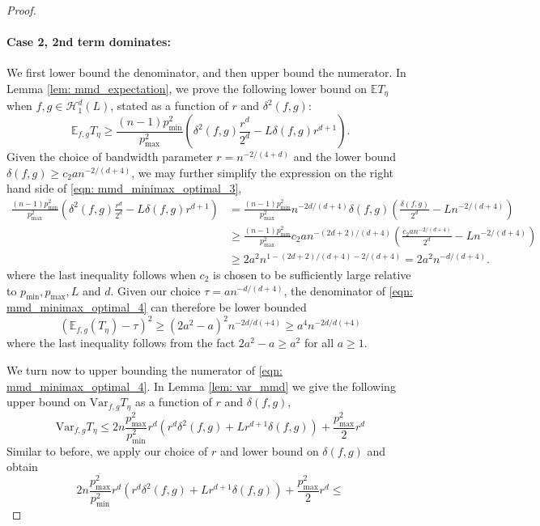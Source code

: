 \documentclass{article}
\newcommand{\Var}{\mathrm{Var}}
\newcommand{\1}{\mathbb{I}}
\newcommand{\Ebb}{\mathbb{E}}
\theoremstyle{alden}
\theoremstyle{aldenthm}
\theoremstyle{definition}
\theoremstyle{remark}
\begin{document}
\begin{proof}
	\paragraph{Case 2, 2nd term dominates:}
	We first lower bound the denominator, and then upper bound the numerator. In Lemma \ref{lem: mmd_expectation}, we prove the following lower bound on $\Ebb T_{\eta}$ when $f,g \in \mathcal{H}_1^{d}(L)$, stated as a function of $r$ and $\delta^2(f,g)$:
	\begin{equation}
	\label{eqn: mmd_minimax_optimal_3}
	\Ebb_{f,g} T_{\eta} \geq \frac{(n - 1)p_{\min}^2}{ p_{\max}^2} \left(\delta^2(f,g)\frac{r^d}{2^d} - L\delta(f,g)r^{d + 1}\right).
	\end{equation}
	Given the choice of bandwidth parameter $r = n^{-2/(4+d)}$ and the lower bound $\delta(f,g) \geq c_2 a n^{-2/(d + 4)}$, we may further simplify the expression on the right hand side of \eqref{eqn: mmd_minimax_optimal_3},
	\begin{align*}
	\frac{(n - 1)p_{\min}^2}{ p_{\max}^2} \left(\delta^2(f,g)\frac{r^d}{2^d} - L\delta(f,g)r^{d + 1}\right) & = \frac{(n - 1)p_{\min}^2}{ p_{\max}^2} n^{-2d/(d+4)} \delta(f,g) \left(\frac{\delta(f,g)}{2^d} - Ln^{-2/(d + 4)} \right) \\
	& \geq \frac{(n - 1)p_{\min}^2}{ p_{\max}^2} c_2 a n^{-(2d + 2)/(d+4)} \left(\frac{c_2 a n^{-2/(d + 4)}}{2^d} - Ln^{-2/(d + 4)} \right) \\
	& \geq 2 a^2 n^{1 - (2d + 2)/(d + 4) - 2/(d + 4)} = 2 a^2 n^{-d/(d + 4)}.
	\end{align*}
	where the last inequality follows when $c_2$ is chosen to be sufficiently large relative to $p_{\min}, p_{\max}, L$ and $d$. Given our choice $\tau = a n^{-d/(d + 4)}$, the denominator of \eqref{eqn: mmd_minimax_optimal_4} can therefore be lower bounded
	\begin{equation*}
	(\Ebb_{f,g}(T_{\eta}) - \tau)^2 \geq (2a^2 - a)^2 n^{-2d/d(+4)} \geq a^4 n^{-2d/d(+4)} 
	\end{equation*}
	where the last inequality follows from the fact $2a^2 - a \geq a^2$ for all $a \geq 1$. 
	
	We turn now to upper bounding the numerator of \eqref{eqn: mmd_minimax_optimal_4}. In Lemma \ref{lem: var_mmd} we give the following upper bound on $\Var_{f,g} T_\eta$ as a function of $r$ and $\delta(f,g)$, 
	\begin{equation*}
	\Var_{f,g} T_\eta \leq 2n \frac{p_{\max}^2}{p_{\min}^2} r^d \left(r^d \delta^2(f,g) + Lr^{d+1}\delta(f,g)\right) + \frac{p_{\max}^2}{2}r^d 
	\end{equation*}
	Similar to before, we apply our choice of $r$ and lower bound on $\delta(f,g)$ and obtain
	\begin{equation*}
	2n \frac{p_{\max}^2}{p_{\min}^2} r^d \left(r^d \delta^2(f,g) + Lr^{d+1}\delta(f,g)\right) + \frac{p_{\max}^2}{2}r^d \leq 
	\end{equation*}
\end{proof}
\end{document}
